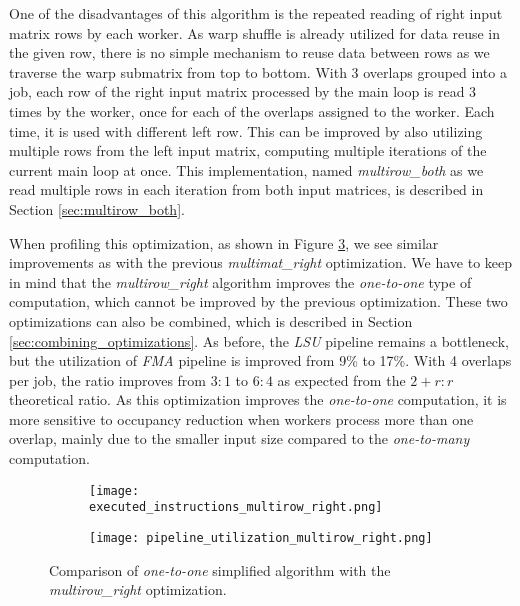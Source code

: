One of the disadvantages of this algorithm is the repeated reading of right input matrix rows by each worker. As warp shuffle is already utilized for data reuse in the given row, there is no simple mechanism to reuse data between rows as we traverse the warp submatrix from top to bottom. With 3 overlaps grouped into a job, each row of the right input matrix processed by the main loop is read 3 times by the worker, once for each of the overlaps assigned to the worker. Each time, it is used with different left row. This can be improved by also utilizing multiple rows from the left input matrix, computing multiple iterations of the current main loop at once. This implementation, named \textit{multirow\_both} as we read multiple rows in each iteration from both input matrices, is described in Section \ref{sec:multirow_both}.


When profiling this optimization, as shown in Figure \ref{fig:multirow_right_profiling}, we see similar improvements as with the previous \textit{multimat\_right} optimization. We have to keep in mind that the \textit{multirow\_right} algorithm improves the \textit{one-to-one} type of computation, which cannot be improved by the previous optimization. These two optimizations can also be combined, which is described in Section \ref{sec:combining_optimizations}. As before, the \textit{LSU} pipeline remains a bottleneck, but the utilization of \textit{FMA} pipeline is improved from 9\% to 17\%. With 4 overlaps per job, the ratio improves from $3 : 1$ to $6 : 4$ as expected from the $2 + r : r$ theoretical ratio. As this optimization improves the \textit{one-to-one} computation, it is more sensitive to occupancy reduction when workers process more than one overlap, mainly due to the smaller input size compared to the \textit{one-to-many} computation.

\begin{figure}[ht]
	\centering	
	\begin{subfigure}{\textwidth}
		\centering
		\texttt{[image: executed\_instructions\_multirow\_right.png]}
		\label{fig:executed_instructions_multirow_right}
	\end{subfigure}
	\hfill
	\begin{subfigure}{\textwidth}
	\centering
		\texttt{[image: pipeline\_utilization\_multirow\_right.png]}
		\label{fig:pipeline_utilization_multirow_right}
	\end{subfigure}
	
	\caption{Comparison of \textit{one-to-one} simplified algorithm with the \textit{multirow\_right} optimization.}
	\label{fig:multirow_right_profiling}
\end{figure}


